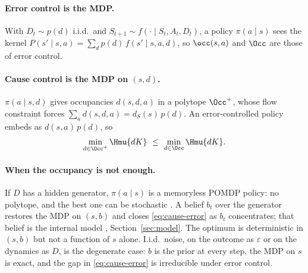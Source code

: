 \paragraph{Error control is the MDP.} With $D_t \sim p(d)$ i.i.d.\ and $S_{t+1} \sim f(\cdot \mid S_t,A_t,D_t)$, a policy $\pi(a \mid s)$ sees the kernel $P(s' \mid s,a) = \sum_d p(d)\, f(s' \mid s,a,d)$, so $\occ(s,a)$ and $\Occ$ are those of error control.

\paragraph{Cause control is the MDP on $(s,d)$.} $\pi(a \mid s,d)$ gives occupancies $d(s,d,a)$ in a polytope $\Occ^{+}$, whose flow constraint forces $\sum_a d(s,d,a) = d_S(s)\, p(d)$.
An error-controlled policy embeds as $d(s,a)\, p(d)$, so
\begin{equation}
  \min_{d \in \Occ^{+}} \Hmu{dK} \ \le\ \min_{d \in \Occ} \Hmu{dK}.
  \label{eq:cause-error}
\end{equation}

\paragraph{When the occupancy is not enough.} If $D$ has a hidden generator, $\pi(a \mid s)$ is a memoryless POMDP policy: no polytope, and the best one can be stochastic \citep{Singh-learning94}.
A belief $b_t$ over the generator restores the MDP on $(s,b)$ and closes \eqref{eq:cause-error} as $b_t$ concentrates; that belief is the internal model \citep{Francis-internal76}, Section~\ref{sec:model}.
The optimum is deterministic in $(s,b)$ but not a function of $s$ alone.
I.i.d.\ noise, on the outcome as $\varepsilon$ or on the dynamics as $D$, is the degenerate case: $b$ is the prior at every step, the MDP on $s$ is exact, and the gap in \eqref{eq:cause-error} is irreducible under error control.

